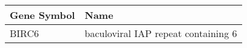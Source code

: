 \begin{tabular}{ll}
\toprule
Gene Symbol &                                Name \\
\midrule
      BIRC6 & baculoviral IAP repeat containing 6 \\
\bottomrule
\end{tabular}
